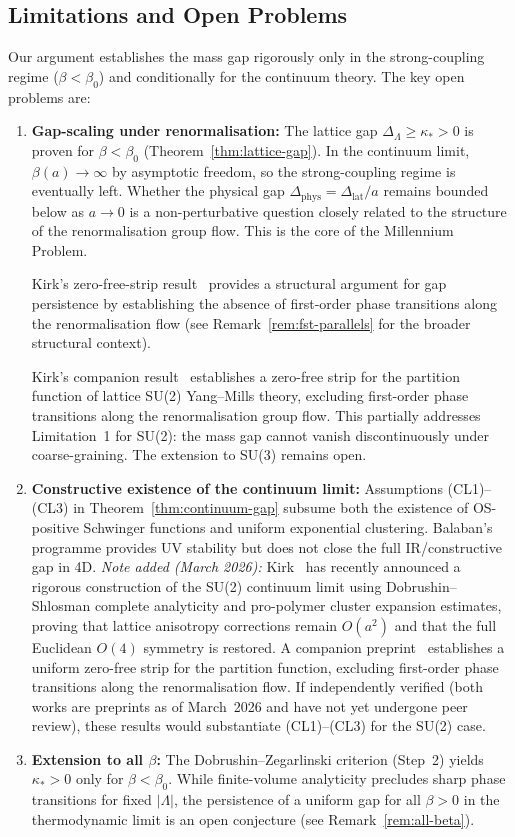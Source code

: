 \documentclass[12pt,a4paper]{article}
\theoremstyle{definition}
\theoremstyle{plain}
\theoremstyle{remark}
\begin{document}
\subsection{Limitations and Open Problems}

Our argument establishes the mass gap rigorously only in the strong-coupling regime ($\beta < \beta_0$) and conditionally for the continuum theory. The key open problems are:
\begin{enumerate}
    \item \textbf{Gap-scaling under renormalisation:} The lattice gap $\Delta_\Lambda \geq \kappa_* > 0$ is proven for $\beta < \beta_0$ (Theorem~\ref{thm:lattice-gap}). In the continuum limit, $\beta(a) \to \infty$ by asymptotic freedom, so the strong-coupling regime is eventually left. Whether the physical gap $\Delta_{\mathrm{phys}} = \Delta_{\mathrm{lat}}/a$ remains bounded below as $a \to 0$ is a non-perturbative question closely related to the structure of the renormalisation group flow. This is the core of the Millennium Problem.

    Kirk's zero-free-strip result~\cite{Kirk2026b} provides a structural argument for gap persistence by establishing the absence of first-order phase transitions along the renormalisation flow (see Remark~\ref{rem:fst-parallels} for the broader structural context).

    Kirk's companion result~\cite{Kirk2026b} establishes a zero-free strip for the partition function of lattice SU(2) Yang--Mills theory, excluding first-order phase transitions along the renormalisation group flow. This partially addresses Limitation~1 for SU(2): the mass gap cannot vanish discontinuously under coarse-graining. The extension to SU(3) remains open.
    \item \textbf{Constructive existence of the continuum limit:} Assumptions (CL1)--(CL3) in Theorem~\ref{thm:continuum-gap} subsume both the existence of OS-positive Schwinger functions and uniform exponential clustering. Balaban's programme provides UV stability but does not close the full IR/constructive gap in 4D. \emph{Note added (March 2026):} Kirk~\cite{Kirk2026} has recently announced a rigorous construction of the SU(2) continuum limit using Dobrushin--Shlosman complete analyticity and pro-polymer cluster expansion estimates, proving that lattice anisotropy corrections remain $O(a^2)$ and that the full Euclidean $O(4)$ symmetry is restored. A companion preprint~\cite{Kirk2026b} establishes a uniform zero-free strip for the partition function, excluding first-order phase transitions along the renormalisation flow. If independently verified (both works are preprints as of March~2026 and have not yet undergone peer review), these results would substantiate (CL1)--(CL3) for the SU(2) case.

    \item \textbf{Extension to all $\beta$:} The Dobrushin--Zegarlinski criterion (Step~2) yields $\kappa_* > 0$ only for $\beta < \beta_0$. While finite-volume analyticity precludes sharp phase transitions for fixed $|\Lambda|$, the persistence of a uniform gap for all $\beta > 0$ in the thermodynamic limit is an open conjecture (see Remark~\ref{rem:all-beta}).
\end{enumerate}
\end{document}
